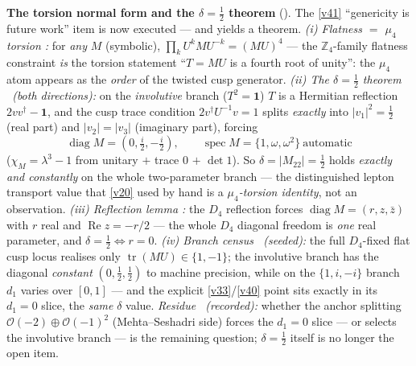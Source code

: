 \documentclass[11pt,a4paper]{article}
\newcommand{\Z}{\mathbb Z}
\begin{document}
\par\smallskip\noindent\textbf{The torsion normal form and the $\delta=\tfrac12$ theorem} (\mE).
The \vref{v41} ``genericity is future work'' item is now executed --- and yields a theorem. \emph{(i) Flatness
$=$ $\mu_4$ torsion \mE:} for \emph{any} $M$ (symbolic), $\prod_k U^kMU^{-k}=(MU)^4$ --- the $\Z_4$-family
flatness constraint \emph{is} the torsion statement ``$T=MU$ is a fourth root of unity'': the $\mu_4$
atom appears as the \emph{order} of the twisted cusp generator. \emph{(ii) The $\delta=\tfrac12$ theorem
\mE\ (both directions):} on the \emph{involutive} branch ($T^2=\mathbf1$) $T$ is a Hermitian reflection
$2vv^\dagger-\mathbf1$, and the cusp trace condition $2v^\dagger U^{-1}v=1$ splits \emph{exactly} into
$|v_1|^2=\tfrac12$ (real part) and $|v_2|=|v_3|$ (imaginary part), forcing
\[
  \boxed{\ \operatorname{diag}M=(0,\tfrac i2,-\tfrac i2),\qquad \operatorname{spec}M=\{1,\omega,\omega^2\}\
  \text{automatic}\ }
\]
($\chi_M=\lambda^3-1$ from unitary $+$ trace $0$ $+$ $\det 1$). So $\delta=|M_{22}|=\tfrac12$ holds
\emph{exactly and constantly} on the whole two-parameter branch --- the distinguished lepton transport
value that \vref{v20} used by hand is a \emph{$\mu_4$-torsion identity}, not an observation. \emph{(iii)
Reflection lemma \mE:} the $D_4$ reflection forces $\operatorname{diag}M=(r,z,\bar z)$ with $r$ real and
$\operatorname{Re}z=-r/2$ --- the whole $D_4$ diagonal freedom is \emph{one} real parameter, and
$\delta=\tfrac12\iff r=0$. \emph{(iv) Branch census \mE\ (seeded):} the full $D_4$-fixed flat cusp locus
realises only $\operatorname{tr}(MU)\in\{1,-1\}$; the involutive branch has the diagonal \emph{constant}
$(0,\tfrac12,\tfrac12)$ to machine precision, while on the $\{1,i,-i\}$ branch $d_1$ varies over $[0,1]$
--- and the explicit \vref{v33}/\vref{v40} point sits exactly in its $d_1=0$ slice, the \emph{same} $\delta$ value.
\emph{Residue \mC\ (recorded):} whether the anchor splitting $\mathcal O(-2)\oplus\mathcal O(-1)^2$
(Mehta--Seshadri side) forces the $d_1=0$ slice --- or selects the involutive branch --- is the remaining
question; $\delta=\tfrac12$ itself is no longer the open item. \veri{v114\_torsion\_delta.py}
\end{document}
